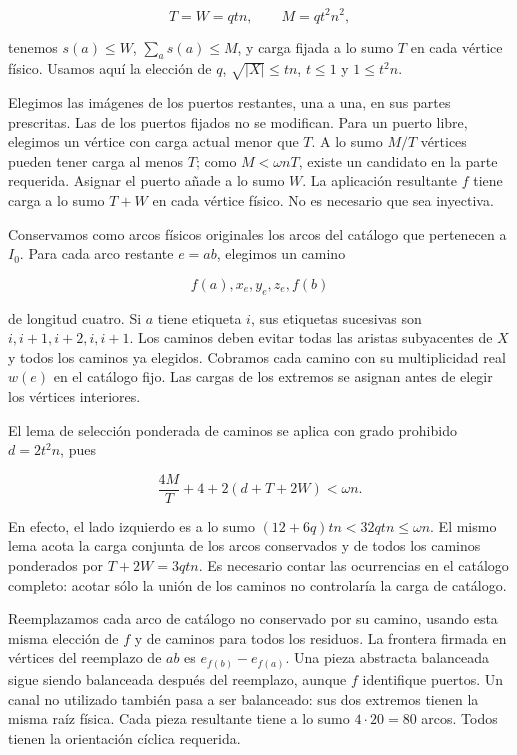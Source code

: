 \documentclass[spanish,11pt,a4paper]{article}
\begin{document}
\[T=W=qtn,\qquad M=qt^2n^2,\]

tenemos \(s(a)\le W\), \(\sum_a s(a)\le M\), y carga fijada a lo sumo \(T\) en cada vértice físico. Usamos aquí la elección de \(q\), \(\sqrt{|X|}\le tn\), \(t\le1\) y \(1\le t^2n\).

Elegimos las imágenes de los puertos restantes, una a una, en sus partes prescritas. Las de los puertos fijados no se modifican. Para un puerto libre, elegimos un vértice con carga actual menor que \(T\). A lo sumo \(M/T\) vértices pueden tener carga al menos \(T\); como \(M<\omega nT\), existe un candidato en la parte requerida. Asignar el puerto añade a lo sumo \(W\). La aplicación resultante \(f\) tiene carga a lo sumo \(T+W\) en cada vértice físico. No es necesario que sea inyectiva.

Conservamos como arcos físicos originales los arcos del catálogo que pertenecen a \(I_0\). Para cada arco restante \(e=ab\), elegimos un camino

\[f(a),x_e,y_e,z_e,f(b)\]

de longitud cuatro. Si \(a\) tiene etiqueta \(i\), sus etiquetas sucesivas son \(i,i+1,i+2,i,i+1\). Los caminos deben evitar todas las aristas subyacentes de \(X\) y todos los caminos ya elegidos. Cobramos cada camino con su multiplicidad real \(w(e)\) en el catálogo fijo. Las cargas de los extremos se asignan antes de elegir los vértices interiores.

El lema de selección ponderada de caminos se aplica con grado prohibido \(d=2t^2n\), pues

\[\frac{4M}{T}+4+2(d+T+2W)<\omega n.\]

En efecto, el lado izquierdo es a lo sumo \((12+6q)tn<32qtn\le\omega n\). El mismo lema acota la carga conjunta de los arcos conservados y de todos los caminos ponderados por \(T+2W=3qtn\). Es necesario contar las ocurrencias en el catálogo completo: acotar sólo la unión de los caminos no controlaría la carga de catálogo.

Reemplazamos cada arco de catálogo no conservado por su camino, usando esta misma elección de \(f\) y de caminos para todos los residuos. La frontera firmada en vértices del reemplazo de \(ab\) es \(e_{f(b)}-e_{f(a)}\). Una pieza abstracta balanceada sigue siendo balanceada después del reemplazo, aunque \(f\) identifique puertos. Un canal no utilizado también pasa a ser balanceado: sus dos extremos tienen la misma raíz física. Cada pieza resultante tiene a lo sumo \(4\cdot20=80\) arcos. Todos tienen la orientación cíclica requerida.
\end{document}
